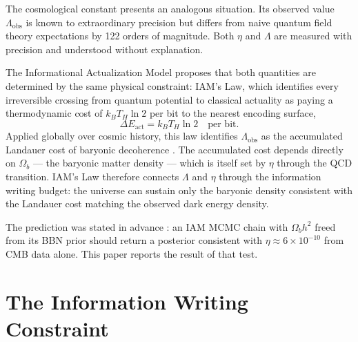 \documentclass[12pt,a4paper]{article}
\begin{document}
The cosmological constant presents an analogous situation. Its
observed value $\Lambda_\mathrm{obs}$ is known to extraordinary
precision but differs from naive quantum field theory expectations
by 122 orders of magnitude. Both $\eta$ and $\Lambda$ are measured
with precision and understood without explanation.

The Informational Actualization Model \citep{mahaffey2026} proposes
that both quantities are determined by the same physical constraint:
IAM's Law, which identifies every irreversible crossing from
quantum potential to classical actuality as paying a thermodynamic
cost of $k_B T_H \ln 2$ per bit to the nearest encoding surface,
\begin{equation}
\Delta E_\mathrm{act} = k_B T_H \ln 2 \quad \text{per bit.}
\label{eq:iams_law}
\end{equation}
Applied globally over cosmic history, this law identifies
$\Lambda_\mathrm{obs}$ as the accumulated Landauer cost of baryonic
decoherence \citep{mahaffey2026_cc}. The accumulated cost depends
directly on $\Omega_b$ — the baryonic matter density — which is
itself set by $\eta$ through the QCD transition. IAM's Law therefore
connects $\Lambda$ and $\eta$ through the information writing
budget: the universe can sustain only the baryonic density
consistent with the Landauer cost matching the observed dark energy
density.

The prediction was stated in advance \citep{mahaffey2026_baryon}:
an IAM MCMC chain with $\Omega_b h^2$ freed from its BBN prior
should return a posterior consistent with $\eta \approx 6 \times
10^{-10}$ from CMB data alone. This paper reports the result of
that test.

\section{The Information Writing Constraint}
\label{sec:constraint}
\end{document}

